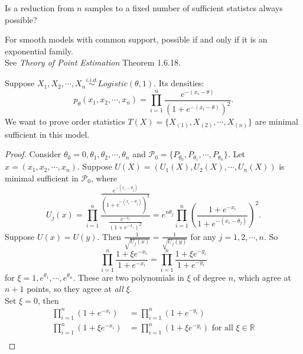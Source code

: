 \documentclass[a4paper]{article}
\begin{document}
\begin{question}
	Is a reduction from $n$ samples to a fixed number of sufficient statistcs always possible?
\end{question}

\begin{answer}
	For smooth models with common support, possible if and only if it is an exponential family. \\
	 See \emph{Theory of Point Estimation} Theorem 1.6.18.
\end{answer}

\begin{eg}
	Suppose $X_1,X_2,\cdots,X_n \stackrel{i.i.d.}{\sim} Logistic(\theta,1)$. Its densities:
	\begin{equation*}
		p_\theta(x_1,x_2,\cdots,x_n)=\prod\limits_{i=1}^n \frac{e^{-(x_i-\theta)}}{(1+e^{-(x_i-\theta)})^2}.
	\end{equation*}
	We want to prove order statistics $T(X) = \{X_{(1)},X_{(2)},\cdots,X_{(n)}\}$ are minimal sufficient in this model.
	\begin{proof}
		Consider $\theta_0 = 0, \theta_1,\theta_2,\cdots,\theta_n$ and $\mathcal{P}_0 = \{P_{\theta_0},P_{\theta_1},\cdots,P_{\theta_n}\}.$ Let $x=(x_1,x_2,\cdots,x_n)$. Suppose $U(X) = (U_1(X),U_2(X),\cdots,U_n(X))$ is minimal sufficient in $\mathcal{P}_0$, where
		\begin{equation}
			U_j(x)= \prod\limits_{i=1}^n \frac{\frac{e^{-(x_i-\theta_j)}}{(1+e^{-(x_i-\theta_j)})^2}}{\frac{e^{-x_i}}{(1+e^{-x_i})^2}} = e^{n \theta_j} \prod \limits_{i=1}^n\left(\frac{1+e^{-x_i}}{1+e^{-(x_i-\theta_j)}}\right)^2.
		\end{equation}
		Suppose $U(x)=U(y)$. Then $\frac{1}{\sqrt{U_j(x)}}=\frac{1}{\sqrt{U_j(y)}} $ for any $j = 1,2, \cdots,n$. So
		\begin{equation}
			\prod\limits_{i=1}^n \frac{1+\xi e^{-x_i}}{1+e^{-x_i}}=\prod\limits_{i=1}^n \frac{1+\xi e^{-y_i}}{1+e^{-y_i}}
		\end{equation}
		for $\xi = 1,e^{\theta_1},\cdots,e^{\theta_n}$. These are two polynomials in $\xi$ of degree $n$, which agree at $n+1$ points, so they agree at \emph{all} $\xi$.\\
		Set $\xi = 0$, then
		\begin{equation}
			\begin{aligned}
				\prod\limits_{i=1}^n(1+e^{-x_i})&=\prod\limits_{i=1}^n(1+e^{-y_i}) \\
				\prod\limits_{i=1}^n(1+\xi e^{-x_i})&=\prod\limits_{i=1}^n(1+\xi e^{-y_i}) \text{ for all } \xi \in \mathbb{R} \\

\end{aligned}
\end{equation}
\end{proof}
\end{eg}
\end{document}
